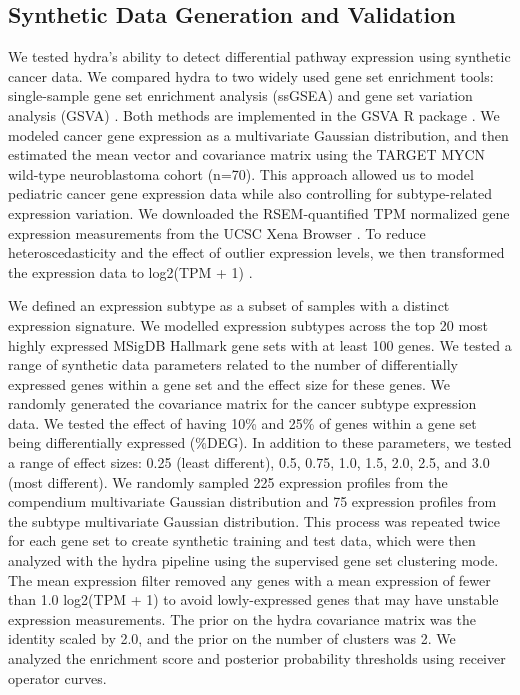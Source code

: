 \documentclass[10pt,letterpaper]{article}
\begin{document}
\subsection*{Synthetic Data Generation and Validation}
We tested hydra's ability to detect differential pathway expression using synthetic cancer data. We compared hydra to two widely used gene set enrichment tools: single-sample gene set enrichment analysis (ssGSEA) and gene set variation analysis (GSVA) \cite{barbieSystematicRNAInterference2009, hanzelmannGSVAGeneSet2013, tarcaComparisonGeneSet2013}. Both methods are implemented in the GSVA R package \cite{hanzelmannGSVAGeneSet2013}. We modeled cancer gene expression as a multivariate Gaussian distribution, and then estimated the mean vector and covariance matrix using the TARGET MYCN wild-type neuroblastoma cohort (n=70). This approach allowed us to model pediatric cancer gene expression data while also controlling for subtype-related expression variation. We downloaded the RSEM-quantified TPM normalized gene expression measurements from the UCSC Xena Browser \cite{goldmanUCSCXenaPlatform2018}. To reduce heteroscedasticity and the effect of outlier expression levels, we then transformed the expression data to log2(TPM + 1) \cite{zwienerTransformingRNASeqData2014}.
 
We defined an expression subtype as a subset of samples with a distinct expression signature. We modelled expression subtypes across the top 20 most highly expressed MSigDB Hallmark gene sets with at least 100 genes. We tested a range of synthetic data parameters related to the number of differentially expressed genes within a gene set and the effect size for these genes. We randomly generated the covariance matrix for the cancer subtype expression data. We tested the effect of having 10\% and 25\% of genes within a gene set being differentially expressed (\%DEG). In addition to these parameters, we tested a range of effect sizes: 0.25 (least different), 0.5, 0.75, 1.0, 1.5, 2.0, 2.5, and 3.0 (most different). We randomly sampled 225 expression profiles from the compendium multivariate Gaussian distribution and 75 expression profiles from the subtype multivariate Gaussian distribution. This process was repeated twice for each gene set to create synthetic training and test data, which were then analyzed with the hydra pipeline using the supervised gene set clustering mode. The mean expression filter removed any genes with a mean expression of fewer than 1.0 log2(TPM + 1) to avoid lowly-expressed genes that may have unstable expression measurements. The prior on the hydra covariance matrix was the identity scaled by 2.0, and the prior on the number of clusters was 2. We analyzed the enrichment score and posterior probability thresholds using receiver operator curves.
\end{document}
